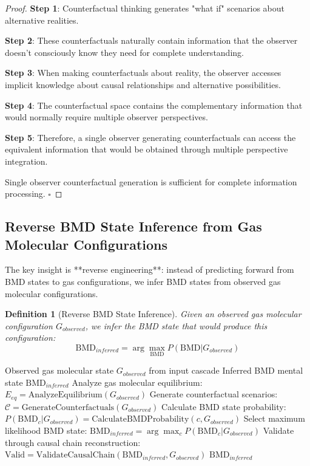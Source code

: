 \documentclass[11pt,a4paper]{article}
\newtheorem{definition}[theorem]{Definition}
\begin{document}
\begin{proof}
\textbf{Step 1}: Counterfactual thinking generates "what if" scenarios about alternative realities.

\textbf{Step 2}: These counterfactuals naturally contain information that the observer doesn't consciously know they need for complete understanding.

\textbf{Step 3}: When making counterfactuals about reality, the observer accesses implicit knowledge about causal relationships and alternative possibilities.

\textbf{Step 4}: The counterfactual space contains the complementary information that would normally require multiple observer perspectives.

\textbf{Step 5}: Therefore, a single observer generating counterfactuals can access the equivalent information that would be obtained through multiple perspective integration.

Single observer counterfactual generation is sufficient for complete information processing. $\square$
\end{proof}

\subsection{Reverse BMD State Inference from Gas Molecular Configurations}

The key insight is **reverse engineering**: instead of predicting forward from BMD states to gas configurations, we infer BMD states from observed gas molecular configurations.

\begin{definition}[Reverse BMD State Inference]
Given an observed gas molecular configuration $G_{observed}$, we infer the BMD state that would produce this configuration:
\begin{equation}
\text{BMD}_{inferred} = \arg\max_{\text{BMD}} P(\text{BMD} | G_{observed})
\end{equation}
\end{definition}

\begin{algorithm}
\caption{Reverse BMD State Inference from Gas Molecular Configuration}
\begin{algorithmic}[1]
\REQUIRE Observed gas molecular state $G_{observed}$ from input cascade
\ENSURE Inferred BMD mental state $\text{BMD}_{inferred}$
\STATE Analyze gas molecular equilibrium: $E_{eq} = \text{AnalyzeEquilibrium}(G_{observed})$
\STATE Generate counterfactual scenarios: $\mathcal{C} = \text{GenerateCounterfactuals}(G_{observed})$
    \STATE Calculate BMD state probability: $P(\text{BMD}_c | G_{observed}) = \text{CalculateBMDProbability}(c, G_{observed})$
\ENDFOR
\STATE Select maximum likelihood BMD state: $\text{BMD}_{inferred} = \arg\max_c P(\text{BMD}_c | G_{observed})$
\STATE Validate through causal chain reconstruction: $\text{Valid} = \text{ValidateCausalChain}(\text{BMD}_{inferred}, G_{observed})$
\RETURN $\text{BMD}_{inferred}$
\end{algorithmic}
\end{algorithm}
\end{document}
